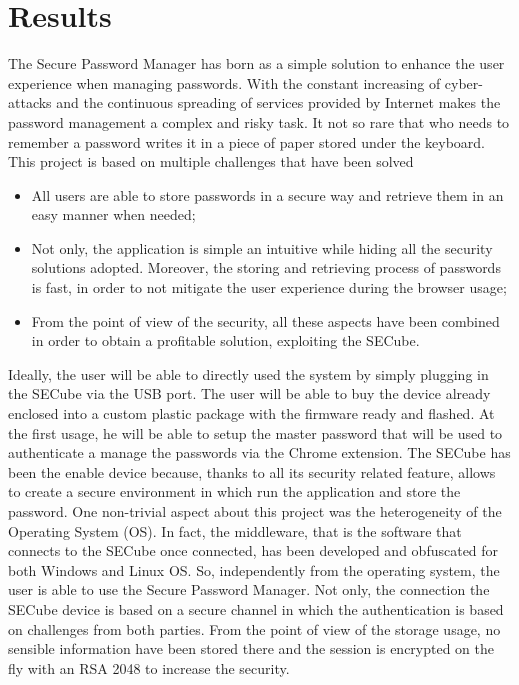 \chapter{Results}
\label{sec:results}

The Secure Password Manager has born as a simple solution to enhance the user experience when managing passwords. With the constant increasing of cyber-attacks and the continuous spreading of services provided by Internet makes the password management a complex and risky task. It not so rare that who needs to remember a password writes it in a piece of paper stored under the keyboard.\newline\newline
This project is based on multiple challenges that have been solved
\begin{itemize}
	\item All users are able to store passwords in a secure way and retrieve them in an easy manner when needed;
	\item Not only, the application is simple an intuitive while hiding all the security solutions adopted. Moreover, the storing and retrieving process of passwords is fast, in order to not mitigate the user experience during the browser usage;
	\item From the point of view of the security, all these aspects have been combined in order to obtain a profitable solution, exploiting the SECube.
\end{itemize}

Ideally, the user will be able to directly used the system by simply plugging in the SECube via the USB port. The user will be able to buy the device already enclosed into a custom plastic package with the firmware ready and flashed. At the first usage, he will be able to setup the master password that will be used to authenticate a manage the passwords via the Chrome extension. The SECube has been the enable device because, thanks to all its security related feature, allows to create a secure environment in which run the application and store the password.\newline\newline
One non-trivial aspect about this project was the heterogeneity of the Operating System (OS). In fact, the middleware, that is the software that connects to the SECube once connected, has been developed and obfuscated for both Windows and Linux OS. So, independently from the operating system, the user is able to use the Secure Password Manager. Not only, the connection the SECube device is based on a secure channel in which the authentication is based on challenges from both parties. From the point of view of the storage usage, no sensible information have been stored there and the session is encrypted on the fly with an RSA 2048 to increase the security. 


